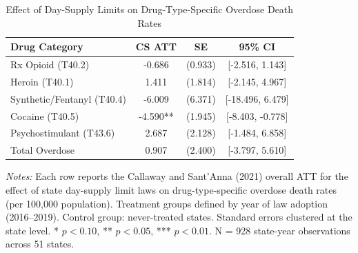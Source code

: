 \begin{table}[H]
\centering
\caption{Effect of Day-Supply Limits on Drug-Type-Specific Overdose Death Rates}
\begin{threeparttable}
\begin{tabular}{lccc}
\toprule
Drug Category & CS ATT & SE & 95\% CI \\
\midrule
Rx Opioid (T40.2) & -0.686 & (0.933) & [-2.516, 1.143] \\
Heroin (T40.1) & 1.411 & (1.814) & [-2.145, 4.967] \\
Synthetic/Fentanyl (T40.4) & -6.009 & (6.371) & [-18.496, 6.479] \\
Cocaine (T40.5) & -4.590** & (1.945) & [-8.403, -0.778] \\
Psychostimulant (T43.6) & 2.687 & (2.128) & [-1.484, 6.858] \\
Total Overdose & 0.907 & (2.400) & [-3.797, 5.610] \\
\bottomrule
\end{tabular}
\begin{tablenotes}[flushleft]
\small
\item \textit{Notes:} Each row reports the Callaway and Sant'Anna (2021) overall ATT for the effect of state day-supply limit laws on drug-type-specific overdose death rates (per 100,000 population). Treatment groups defined by year of law adoption (2016--2019). Control group: never-treated states. Standard errors clustered at the state level. * $p<0.10$, ** $p<0.05$, *** $p<0.01$. N = 928 state-year observations across 51 states.
\end{tablenotes}
\end{threeparttable}
\label{tab:main}
\end{table}
